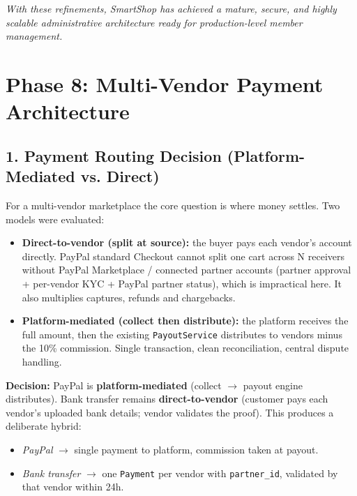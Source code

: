 \documentclass[12pt,a4paper]{article}
\begin{document}
\vfill
\begin{center}
    \textit{With these refinements, SmartShop has achieved a mature, secure, and highly scalable administrative architecture ready for production-level member management.}
\end{center}

\section{Phase 8: Multi-Vendor Payment Architecture}

\subsection{1. Payment Routing Decision (Platform-Mediated vs. Direct)}

For a multi-vendor marketplace the core question is where money settles. Two models were evaluated:

\begin{itemize}
    \item \textbf{Direct-to-vendor (split at source):} the buyer pays each vendor's account directly. PayPal standard Checkout cannot split one cart across N receivers without PayPal Marketplace / connected partner accounts (partner approval + per-vendor KYC + PayPal partner status), which is impractical here. It also multiplies captures, refunds and chargebacks.
    \item \textbf{Platform-mediated (collect then distribute):} the platform receives the full amount, then the existing \texttt{PayoutService} distributes to vendors minus the 10\% commission. Single transaction, clean reconciliation, central dispute handling.
\end{itemize}

\textbf{Decision:} PayPal is \textbf{platform-mediated} (collect $\rightarrow$ payout engine distributes). Bank transfer remains \textbf{direct-to-vendor} (customer pays each vendor's uploaded bank details; vendor validates the proof). This produces a deliberate hybrid:

\begin{itemize}
    \item \textit{PayPal} $\rightarrow$ single payment to platform, commission taken at payout.
    \item \textit{Bank transfer} $\rightarrow$ one \texttt{Payment} per vendor with \texttt{partner\_id}, validated by that vendor within 24h.
\end{itemize}
\end{document}
